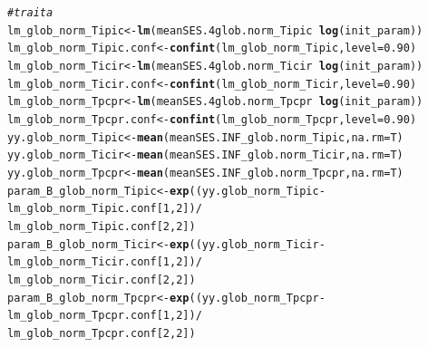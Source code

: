 \documentclass[12pt]{article}\usepackage[]{graphicx}\usepackage[]{color}
\makeatletter
\newcommand{\hlnum}[1]{\textcolor[rgb]{0.686,0.059,0.569}{#1}}%
\newcommand{\hlcom}[1]{\textcolor[rgb]{0.678,0.584,0.686}{\textit{#1}}}%
\newcommand{\hlopt}[1]{\textcolor[rgb]{0,0,0}{#1}}%
\newcommand{\hlstd}[1]{\textcolor[rgb]{0.345,0.345,0.345}{#1}}%
\newcommand{\hlkwb}[1]{\textcolor[rgb]{0.69,0.353,0.396}{#1}}%
\newcommand{\hlkwc}[1]{\textcolor[rgb]{0.333,0.667,0.333}{#1}}%
\newcommand{\hlkwd}[1]{\textcolor[rgb]{0.737,0.353,0.396}{\textbf{#1}}}%
\newenvironment{kframe}{%
 \def\at@end@of@kframe{}%
 \ifinner\ifhmode%
  \def\at@end@of@kframe{\end{minipage}}%
  \begin{minipage}{\columnwidth}%
 \fi\fi%
 \def\FrameCommand##1{\hskip\@totalleftmargin \hskip-\fboxsep
 \colorbox{shadecolor}{##1}\hskip-\fboxsep
     \hskip-\linewidth \hskip-\@totalleftmargin \hskip\columnwidth}%
 \MakeFramed {\advance\hsize-\width
   \@totalleftmargin\z@ \linewidth\hsize
   \@setminipage}}%
 {\par\unskip\endMakeFramed%
 \at@end@of@kframe}
\newenvironment{knitrout}{}{} %
\makeatother
\begin{document}
\begin{knitrout}\small
{}\color{fgcolor}\begin{kframe}
\begin{alltt}
\hlcom{# trait a}
\hlstd{lm_glob_norm_Tipic} \hlkwb{<-} \hlkwd{lm}\hlstd{(meanSES.4glob.norm_Tipic} \hlopt{~} \hlkwd{log}\hlstd{(init_param))}
\hlstd{lm_glob_norm_Tipic.conf} \hlkwb{<-} \hlkwd{confint}\hlstd{(lm_glob_norm_Tipic ,} \hlkwc{level} \hlstd{=} \hlnum{0.90}\hlstd{)}
\hlstd{lm_glob_norm_Ticir} \hlkwb{<-} \hlkwd{lm}\hlstd{(meanSES.4glob.norm_Ticir} \hlopt{~} \hlkwd{log}\hlstd{(init_param))}
\hlstd{lm_glob_norm_Ticir.conf} \hlkwb{<-} \hlkwd{confint}\hlstd{(lm_glob_norm_Ticir ,} \hlkwc{level} \hlstd{=} \hlnum{0.90}\hlstd{)}
\hlstd{lm_glob_norm_Tpcpr} \hlkwb{<-} \hlkwd{lm}\hlstd{(meanSES.4glob.norm_Tpcpr} \hlopt{~} \hlkwd{log}\hlstd{(init_param))}
\hlstd{lm_glob_norm_Tpcpr.conf} \hlkwb{<-} \hlkwd{confint}\hlstd{(lm_glob_norm_Tpcpr ,} \hlkwc{level} \hlstd{=} \hlnum{0.90}\hlstd{)}
\hlstd{yy.glob_norm_Tipic} \hlkwb{<-} \hlkwd{mean}\hlstd{(meanSES.INF_glob.norm_Tipic,} \hlkwc{na.rm} \hlstd{= T)}
\hlstd{yy.glob_norm_Ticir} \hlkwb{<-} \hlkwd{mean}\hlstd{(meanSES.INF_glob.norm_Ticir,} \hlkwc{na.rm} \hlstd{= T)}
\hlstd{yy.glob_norm_Tpcpr} \hlkwb{<-} \hlkwd{mean}\hlstd{(meanSES.INF_glob.norm_Tpcpr,} \hlkwc{na.rm} \hlstd{= T)}
\hlstd{param_B_glob_norm_Tipic} \hlkwb{<-} \hlkwd{exp}\hlstd{( (yy.glob_norm_Tipic} \hlopt{-} \hlstd{lm_glob_norm_Tipic.conf [}\hlnum{1}\hlstd{,} \hlnum{2}\hlstd{])} \hlopt{/}
                                  \hlstd{lm_glob_norm_Tipic.conf [}\hlnum{2}\hlstd{,} \hlnum{2}\hlstd{] )}
\hlstd{param_B_glob_norm_Ticir} \hlkwb{<-} \hlkwd{exp}\hlstd{( (yy.glob_norm_Ticir} \hlopt{-} \hlstd{lm_glob_norm_Ticir.conf [}\hlnum{1}\hlstd{,} \hlnum{2}\hlstd{])} \hlopt{/}
                                  \hlstd{lm_glob_norm_Ticir.conf [}\hlnum{2}\hlstd{,} \hlnum{2}\hlstd{] )}
\hlstd{param_B_glob_norm_Tpcpr} \hlkwb{<-} \hlkwd{exp}\hlstd{( (yy.glob_norm_Tpcpr} \hlopt{-} \hlstd{lm_glob_norm_Tpcpr.conf [}\hlnum{1}\hlstd{,} \hlnum{2}\hlstd{])} \hlopt{/}
                                  \hlstd{lm_glob_norm_Tpcpr.conf [}\hlnum{2}\hlstd{,} \hlnum{2}\hlstd{] )}


\end{alltt}
\end{kframe}
\end{knitrout}
\end{document}
